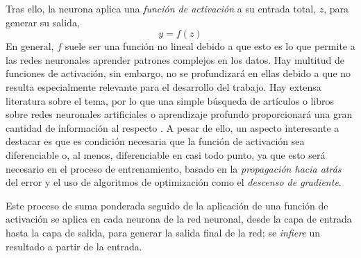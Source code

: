 \documentclass[a4paper, 11pt]{article}
\begin{document}
Tras ello, la neurona aplica una \textit{función de activación} a su entrada total, $z$, para generar
su salida,
\begin{equation}
  y = f(z) \label{na_activacion}
\end{equation}
En general, $f$ suele ser una función no lineal debido a que esto es lo que permite a las redes
neuronales aprender patrones complejos en los datos. Hay multitud de funciones de activación, sin
embargo, no se profundizará en ellas debido a que no resulta especialmente relevante para el
desarrollo del trabajo. Hay extensa literatura sobre el tema, por lo que una simple búsqueda de
artículos o libros sobre redes neuronales artificiales o aprendizaje profundo proporcionará una gran
cantidad de información al respecto
\cite{kunc2024decadesactivationscomprehensivesurvey,dubey2022activationfunctionsdeeplearning}. A
pesar de ello, un aspecto interesante a destacar es que es condición necesaria que la función de
activación sea diferenciable o, al menos, diferenciable en casi todo punto, ya que esto será
necesario en el proceso de entrenamiento, basado en la \textit{propagación hacia atrás} del error y
el uso de algoritmos de optimización como el \textit{descenso de gradiente}.

Este proceso de suma ponderada seguido de la aplicación de una función de activación se aplica en
cada neurona de la red neuronal, desde la capa de entrada hasta la capa de salida, para generar la
salida final de la red; se \textit{infiere} un resultado a partir de la entrada.
\end{document}
